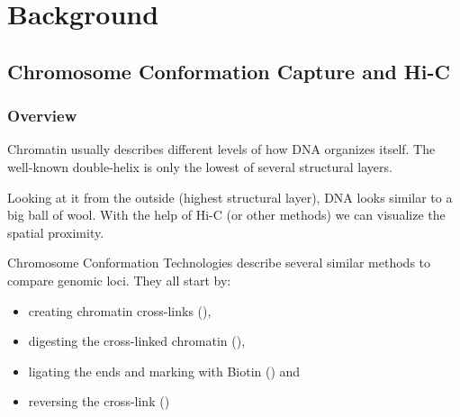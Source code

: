 \chapter{Background}\label{chap:background}
% 
% 

\section{Chromosome Conformation Capture and Hi-C}\label{sec:c3}\label{sec:hic}



\subsection{Overview}











Chromatin usually describes different levels of how DNA organizes itself. The
well-known double-helix is only the lowest of several structural layers.

Looking at it from the outside (highest structural layer), DNA looks similar to
a big ball of wool. With the help of Hi-C (or other methods) we can visualize
the spatial proximity.




Chromosome Conformation Technologies describe several similar methods to
compare genomic loci. They all start by:

\begin{itemize}
    \item creating chromatin cross-links (),
    \item digesting the cross-linked chromatin (),
    \item ligating the ends and marking with Biotin () and
    \item reversing the cross-link ()
\end{itemize}

